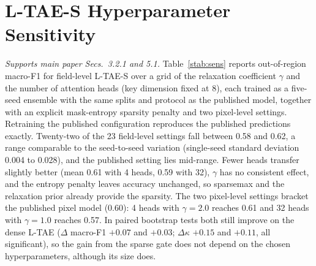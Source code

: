 \documentclass[preprint,authoryear,3p]{elsarticle}
\begin{document}
\section{L-TAE-S Hyperparameter Sensitivity}
\label{sec:sens}
\emph{Supports main paper Secs.~3.2.1 and 5.1.}
Table~\ref{stab:sens} reports out-of-region macro-F1 for field-level L-TAE-S over a grid of the relaxation coefficient $\gamma$ and the number of attention heads (key dimension fixed at 8), each trained as a five-seed ensemble with the same splits and protocol as the published model, together with an explicit mask-entropy sparsity penalty and two pixel-level settings. Retraining the published configuration reproduces the published predictions exactly. Twenty-two of the 23 field-level settings fall between 0.58 and 0.62, a range comparable to the seed-to-seed variation (single-seed standard deviation 0.004 to 0.028), and the published setting lies mid-range. Fewer heads transfer slightly better (mean 0.61 with 4 heads, 0.59 with 32), $\gamma$ has no consistent effect, and the entropy penalty leaves accuracy unchanged, so sparsemax and the relaxation prior already provide the sparsity. The two pixel-level settings bracket the published pixel model (0.60): 4 heads with $\gamma=2.0$ reaches 0.61 and 32 heads with $\gamma=1.0$ reaches 0.57. In paired bootstrap tests both still improve on the dense L-TAE ($\Delta$ macro-F1 $+0.07$ and $+0.03$; $\Delta\kappa$ $+0.15$ and $+0.11$, all significant), so the gain from the sparse gate does not depend on the chosen hyperparameters, although its size does.
\end{document}

